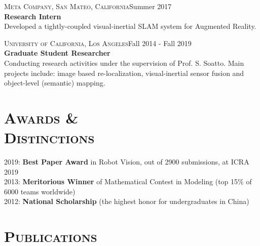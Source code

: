 \documentclass[margin, line, 10pt]{res} %
\begin{document}
\begin{resume}
\textsc{Meta Company, San Mateo, California}\hfill Summer 2017\\
\textbf{Research Intern}\\
Developed a tightly-coupled visual-inertial SLAM system for Augmented Reality.

\textsc{University of California, Los Angeles}\hfill Fall 2014 - Fall 2019\\
\textbf{Graduate Student Researcher}\\
Conducting research activities under the supervision of Prof. S. Soatto. Main projects include: image based re-localization, visual-inertial sensor fusion and object-level (semantic) mapping.




\section{\textsc{Awards \&\\Distinctions}}
2019: {\bf Best Paper Award} in Robot Vision, out of 2900 submissions, at ICRA 2019\\
2013: {\bf Meritorious Winner} of Mathematical Contest in Modeling (top 15\% of 6000 teams worldwide)\\
2012: {\bf National Scholarship} (the highest honor for undergraduates in China)

\section{\textsc{Publications}}


\end{resume}
\end{document}
